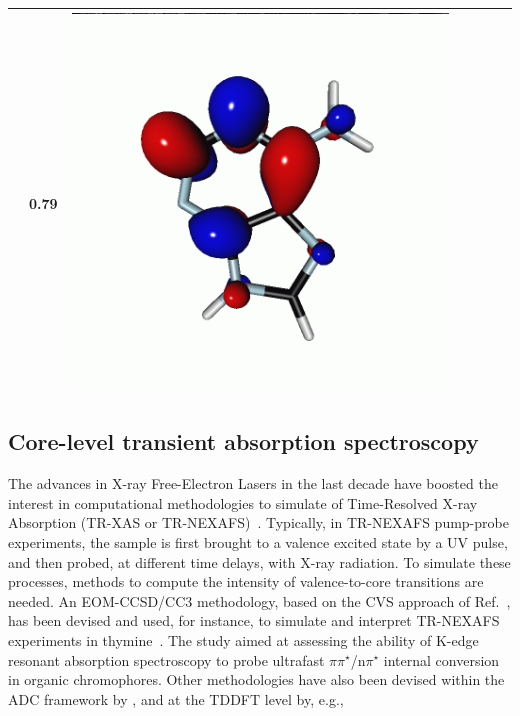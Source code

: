 \documentclass[journal=jctcce,manuscript=article]{achemso}
\begin{document}
\begin{table}[H]
\begin{tabular}{ l | c c c | c c c }
\begin{minipage}{0.2\textwidth}
    \end{minipage}
    & 0.79 & 
    \begin{minipage}{0.2\textwidth}
        \centering
        \includegraphics[scale=0.10]{NTO/Adenine_N/3p_Cs.png}
    \end{minipage}
    \\
    \hline
\end{tabular}
\end{table}


\subsection{Core-level transient absorption spectroscopy}

The advances in X-ray Free-Electron Lasers in the last decade
have boosted the interest in computational methodologies to simulate of Time-Resolved X-ray Absorption (TR-XAS or TR-NEXAFS)~\cite{Milne2014,TransientXAS_H2O,acac_ultrafast_ISC,naturecomm}. Typically, in TR-NEXAFS pump-probe experiments, the sample is first brought to a valence excited state by a UV pulse, and then probed, at different time delays, with X-ray radiation. 
To simulate these processes, methods to compute the intensity of valence-to-core transitions  are needed.
An EOM-CCSD/CC3 methodology, based on the CVS approach of Ref.~, has been devised and used, for 
instance, to simulate and interpret TR-NEXAFS experiments in thymine~\cite{naturecomm}. The study aimed at assessing 
the ability of K-edge resonant absorption spectroscopy 
to probe ultrafast $\pi\pi^\star$/n$\pi^\star$ internal 
conversion in organic chromophores.
Other methodologies have also been devised within the ADC framework
by \citeauthor{Neville_ADC_TRNEXAFS}
\cite{Neville_ADC_TRNEXAFS,Neville_TRXAS,Neville_TRXAS_at_CI}, and at the TDDFT level by, e.g.,~\citeauthor{acac_ultrafast_ISC}\cite{acac_ultrafast_ISC}
\end{document}
